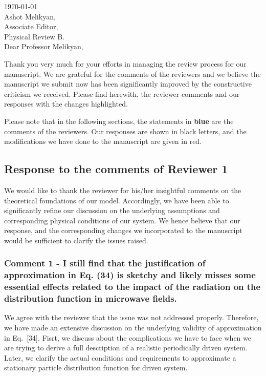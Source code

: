\documentclass{article}
\begin{document}

\today\\

Ashot Melikyan,\\
Associate Editor,\\
Physical Review B.\\

Dear Professor Melikyan,

Thank you very much for your efforts in managing the review process for our manuscript. We are grateful for the comments of the reviewers and we believe the manuscript we submit now has been significantly improved by the constructive criticism we received. Please find herewith, the reviewer comments and our responses with the changes highlighted.

Please note that in the following sections, the statements in {\color{RoyalBlue} \textbf{blue}} are the comments of the reviewers. Our responses are shown in black letters, and the modifications we have done to the manuscript are given in {\color{Red} red}.

\subsection*{Response to the comments of Reviewer 1}

We would like to thank the reviewer for his/her insightful comments on the theoretical foundations of our model. Accordingly, we have been able to significantly refine our discussion on the underlying assumptions and corresponding physical conditions of our system. We hence believe that our response, and the corresponding changes we incorporated to the manuscript would be sufficient to clarify the issues raised.

\subsubsection*{Comment 1 -
\color{RoyalBlue} I still find that the justification of approximation in Eq. (34) is sketchy and likely misses some essential effects related to the impact of the radiation on the distribution function in microwave fields.}

We agree with the reviewer that the issue was not addressed properly. Therefore, we have made an extensive discussion on the underlying validity of approximation in Eq.~[34]. Fisrt, we discuss about the complications we have to face when we are trying to derive a full description of a realistic periodically driven system. Later, we clarify the actual conditions and requirements to approximate a stationary particle distribution function for driven system.
\end{document}
